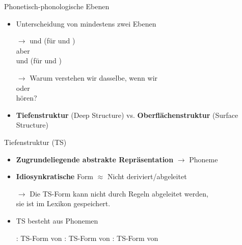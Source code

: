 \begin{frame}{Phonetisch-phonologische Ebenen}

	\begin{itemize}
		\item Unterscheidung von mindestens zwei Ebenen
		\item[$\rightarrow$]  und  (für  und )\\
		aber\\
		 und  (für  und )
		\item[]
		\item[$\rightarrow$] Warum verstehen wir dasselbe, wenn wir\\
		\textipa{[h a: k @ \alertred{n}]} oder \textipa{[h a: k \alertred{N}]}\\
		hören?
		\item[]
		\item \textbf{Tiefenstruktur} (Deep Structure) vs. \textbf{Oberflächenstruktur} (Surface Structure)
	\end{itemize}
	
\end{frame}



%
%

\begin{frame}{Tiefenstruktur (TS)}
	
\begin{itemize}
	\item \textbf{Zugrundeliegende abstrakte Repräsentation} $\rightarrow$ Phoneme \textipa{/ /}
	\item[]
	\item \textbf{Idiosynkratische} Form $\approx$ Nicht deriviert/abgeleitet
	\item[$\rightarrow$] Die TS-Form kann nicht durch Regeln abgeleitet werden,\\
                sie ist im Lexikon gespeichert.
	\item[]
	\item TS besteht aus Phonemen
	
	\eal
		\ex {}: TS-Form von 
		\ex {}: TS-Form von 
		\ex {}: TS-Form von 
	\zl
	
\end{itemize}
		
\end{frame}



